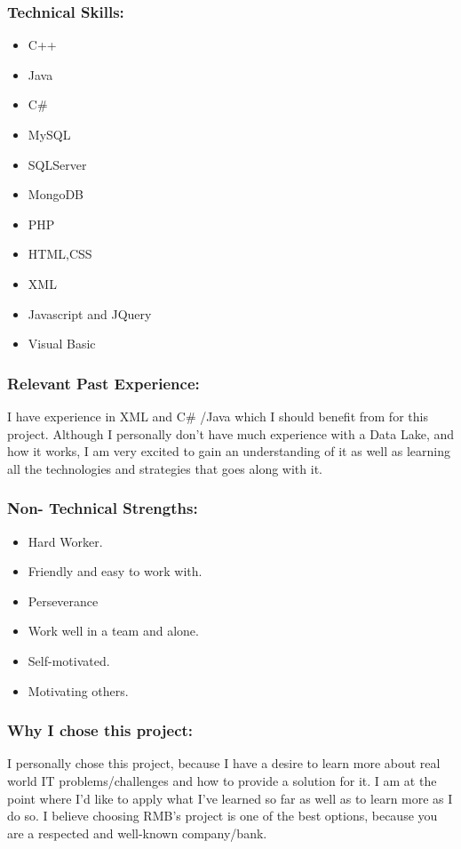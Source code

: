 \subsubsection{Technical Skills:}
	\begin{itemize}
		\item C++
		\item Java
		\item	C\#
		\item	MySQL
		\item	SQLServer
		\item	MongoDB
		\item PHP
		\item HTML,CSS
		\item XML
		\item Javascript and JQuery
		\item Visual Basic 
	\end{itemize}

\subsubsection{Relevant Past Experience:}
	\par{I have experience in XML and C\# /Java which I should benefit from for this project. Although I personally don't have much experience with a Data Lake, and how it works, I am very excited to gain an understanding of it as well as learning all the technologies and strategies that goes along with it.}

\subsubsection{Non- Technical Strengths:}
	\begin{itemize}
		\item Hard Worker.
		\item Friendly and easy to work with.
		\item Perseverance
		\item Work well in a team and alone.
		\item Self-motivated.
		\item Motivating others.
	\end{itemize}

\subsubsection{Why I chose this project:}
	\par{I personally chose this project, because I have a desire to learn more about real world IT problems/challenges and how to provide a solution for it. I am at the point where I'd like to apply what I've learned so far as well as to learn more as I do so. I believe choosing RMB's project is one of the best options, because you are a respected and well-known company/bank.}

